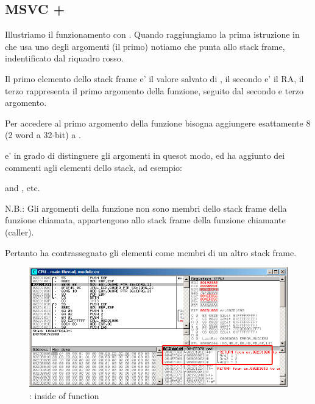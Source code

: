 \subsection{MSVC + \olly}
\myindex{\olly}
Illustriamo il funzionamento con \olly.
Quando raggiungiamo la prima istruzione in \ttf che usa uno degli argomenti (il primo) 
notiamo che \EBP punta allo \gls{stack frame}, indentificato dal riquadro rosso.

Il primo elemento dello \gls{stack frame} e' il valore salvato di \EBP, 
il secondo e' il \ac{RA}, il terzo rappresenta il primo argomento della funzione, seguito dal secondo e terzo argomento.

Per accedere al primo argomento della funzione bisogna aggiungere esattamente 8 (2 word a 32-bit) a \EBP.

\olly e' in grado di distinguere gli argomenti in quesot modo, ed ha aggiunto dei commenti agli elementi dello stack, ad esempio:

 and , etc.

N.B.: Gli argomenti della funzione non sono membri dello stack frame della funzione chiamata, appartengono allo stack frame della
funzione chiamante (\gls{caller}).

Pertanto \olly ha contrassegnato gli elementi  come membri di un altro stack frame.

\begin{figure}[H]
\centering
\includegraphics[scale=\FigScale]{patterns/05_passing_arguments/olly.png}
\caption{\olly: inside of \ttf{} function}
\label{fig:passing_arguments_olly}
\end{figure}
